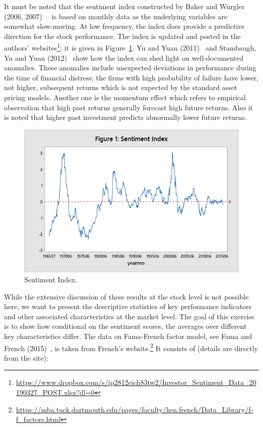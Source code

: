  
It must be noted that the sentiment index constructed by Baker and Wurgler (2006, 2007)~\cite{baker2006investor}~\cite{baker2007investor} is based on monthly data as the underlying variables are somewhat slow-moving. At low frequency, the index does provide a predictive direction for the stock performance. The index is updated and posted in the authors' websites\footnote{\url{https://www.dropbox.com/s/ip2812eich83tw2/Investor_Sentiment_Data_20190327_POST.xlsx?dl=0}}; it is given in Figure~\ref{fig:sentimentindex}. Yu and Yuan (2011)~\cite{yuyuan} and Stambaugh, Yu and Yuan (2012)~\cite{stamb} show how the index can shed light on well-documented anomalies. These anomalies include unexpected deviations in performance during the time of financial distress; the firms with high probability of failure have lower, not higher, subsequent returns which is not expected by the standard asset pricing models. Another one is the momentum effect which refers to empirical observation that high past returns generally forecast high future returns. Also it is noted that higher past investment predicts abnormally lower future returns. 
	 \begin{figure}[!ht]
	\centering
	\includegraphics[width=\textwidth]{chapters/chapter_news_an/figures/ch4sec1sentimentindex.png}
	\caption{Sentiment Index.\label{fig:sentimentindex}}
	\end{figure}


While the extensive discussion of these results at the stock level is not possible here, we want to present the descriptive statistics of key performance indicators and other associated characteristics at the market level. The goal of this exercise is to show how conditional on the sentiment scores, the averages over different key characteristics differ. The data on Fama-French factor model, see Fama and French (2015)~\cite{fama2015international}, is taken from French's website.\footnote{\url{https://mba.tuck.dartmouth.edu/pages/faculty/ken.french/Data_Library/f-f_factors.html}} It consists of (details are directly from the site):


